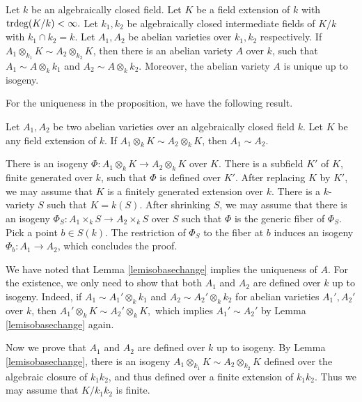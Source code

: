 \documentclass[12pt]{amsart}
\begin{document}
\begin{pro}\label{lembasechangediagram}
Let $k$ be an algebraically closed field. Let $K$ be a field extension of $k$ with ${\mathrm{trdeg}}(K/k)<\infty.$
Let $k_1,k_2$ be algebraically closed intermediate fields of $K/k$ with $k_1\cap k_2=k.$
Let $A_1,A_2$ be abelian varieties over $k_1,k_2$ respectively. 
 If $A_1\otimes_{k_1}K\sim A_2\otimes_{k_2}K$, then there is an abelian variety
$A$ over $k$, such that $A_1\sim A\otimes_{k}k_1$ and $A_2\sim A\otimes_{k}k_2.$
Moreover, the abelian variety $A$ is unique up to isogeny. 
\end{pro}

For the uniqueness in the proposition, we have the following result. 

\begin{lem}\label{lemisobasechange}
Let $A_1,A_2$ be two abelian varieties over an algebraically closed field $k$.  Let $K$ be any field extension of $k$. If $A_1\otimes_kK\sim A_2\otimes_kK$, then $A_1\sim A_2.$
\end{lem}

\proof
There is an isogeny  $\Phi: A_1\otimes_kK\to A_2\otimes_kK$ over $K.$ There is a subfield $K'$ of $K$, finite generated over $k$, such that $\Phi$ is defined over $K'$. After replacing $K$ by $K'$, we may assume that $K$ is a finitely generated extension over $k$.
There is a $k$-variety $S$ such that $K=k(S).$ After shrinking $S$, we may assume that there is an isogeny $\Phi_S: A_1\times_k S\to A_2\times_k S$ over $S$ such that $\Phi$ is the generic fiber of $\Phi_S.$ Pick a point $b\in S(k)$. The restriction of $\Phi_S$ to the fiber at $b$ induces an isogeny $\Phi_b: A_1\to A_2$, which concludes the proof.
\endproof


We have noted that Lemma \ref{lemisobasechange} implies the uniqueness of $A.$
For the existence, we only need to show that both $A_1$ and $A_2$ are defined over $k$ up to isogeny.
Indeed, if $A_1\sim A_1'\otimes_kk_1$ and  $A_2\sim A_2'\otimes_kk_2$ for abelian varieties $A_1',A_2'$ over $k$, then $A_1'\otimes_kK\sim A_2'\otimes_kK,$
which implies $A_1'\sim A_2'$ by Lemma \ref{lemisobasechange} again.

Now we prove that $A_1$ and $A_2$ are defined over $k$ up to isogeny.
By Lemma \ref{lemisobasechange}, there is an isogeny 
$A_1\otimes_{k_1}K\sim A_2\otimes_{k_2}K$ defined over the algebraic closure of $k_1k_2$, and thus defined over a finite extension of $k_1k_2$. 
Thus we may assume that $K/k_1k_2$ is finite.
\end{document}
